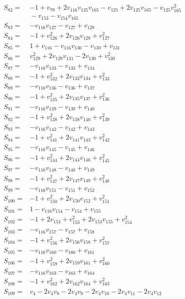 \documentclass[11pt]{article}
\begin{document}
\begin{align*}
S_{82}={}&-1+v_{79}+2v_{116}v_{125}v_{165}-v_{125}+2v_{125}v_{165}-v_{125}v_{165}^{2}\\
&{}-v_{153}-v_{154}v_{165}\\
S_{83}={}&-v_{116}v_{127}-v_{127}+v_{128}\\
S_{84}={}&-1+v_{126}^{2}+2v_{126}v_{128}+v_{127}^{2}\\
S_{85}={}&1+v_{116}-v_{116}v_{130}-v_{130}+v_{131}\\
S_{86}={}&v_{129}^{2}+2v_{129}v_{131}-2v_{130}+v_{130}^{2}\\
S_{87}={}&-v_{116}v_{133}-v_{133}+v_{134}\\
S_{88}={}&-1+v_{132}^{2}+2v_{132}v_{134}+v_{133}^{2}\\
S_{89}={}&-v_{116}v_{136}-v_{136}+v_{137}\\
S_{90}={}&-1+v_{135}^{2}+2v_{135}v_{137}+v_{136}^{2}\\
S_{91}={}&-v_{116}v_{139}-v_{139}+v_{140}\\
S_{92}={}&-1+v_{138}^{2}+2v_{138}v_{140}+v_{139}^{2}\\
S_{93}={}&-v_{116}v_{142}-v_{142}+v_{143}\\
S_{94}={}&-1+v_{141}^{2}+2v_{141}v_{143}+v_{142}^{2}\\
S_{95}={}&-v_{116}v_{145}-v_{145}+v_{146}\\
S_{96}={}&-1+v_{144}^{2}+2v_{144}v_{146}+v_{145}^{2}\\
S_{97}={}&-v_{116}v_{148}-v_{148}+v_{149}\\
S_{98}={}&-1+v_{147}^{2}+2v_{147}v_{149}+v_{148}^{2}\\
S_{99}={}&-v_{116}v_{151}-v_{151}+v_{152}\\
S_{100}={}&-1+v_{150}^{2}+2v_{150}v_{152}+v_{151}^{2}\\
S_{101}={}&1-v_{116}v_{154}-v_{154}+v_{155}\\
S_{102}={}&-1+2v_{153}+v_{153}^{2}+2v_{153}v_{155}+v_{154}^{2}\\
S_{103}={}&-v_{116}v_{157}-v_{157}+v_{158}\\
S_{104}={}&-1+v_{156}^{2}+2v_{156}v_{158}+v_{157}^{2}\\
S_{105}={}&-v_{116}v_{160}-v_{160}+v_{161}\\
S_{106}={}&-1+v_{159}^{2}+2v_{159}v_{161}+v_{160}^{2}\\
S_{107}={}&-v_{116}v_{163}-v_{163}+v_{164}\\
S_{108}={}&-1+v_{162}^{2}+2v_{162}v_{164}+v_{163}^{2}\\
S_{109}={}&v_{4}-2v_{4}v_{8}-2v_{4}v_{9}-2v_{4}v_{10}-2v_{4}v_{11}-2v_{4}v_{12}\\

\end{align*}
\end{document}
